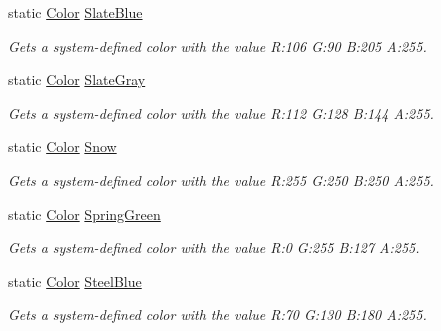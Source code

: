 \begin{DoxyCompactItemize}
static \hyperlink{struct_microsoft_1_1_xna_1_1_framework_1_1_color}{Color} \hyperlink{struct_microsoft_1_1_xna_1_1_framework_1_1_color_aaae7c7f86386d149db4082776120bf44}{Slate\+Blue}
\begin{DoxyCompactList}\small\item\em Gets a system-\/defined color with the value R\+:106 G\+:90 B\+:205 A\+:255.\end{DoxyCompactList}\item 
static \hyperlink{struct_microsoft_1_1_xna_1_1_framework_1_1_color}{Color} \hyperlink{struct_microsoft_1_1_xna_1_1_framework_1_1_color_a8cf2b439c5dec633c21744030a33976c}{Slate\+Gray}
\begin{DoxyCompactList}\small\item\em Gets a system-\/defined color with the value R\+:112 G\+:128 B\+:144 A\+:255.\end{DoxyCompactList}\item 
static \hyperlink{struct_microsoft_1_1_xna_1_1_framework_1_1_color}{Color} \hyperlink{struct_microsoft_1_1_xna_1_1_framework_1_1_color_aa5de5b0cb8d037ade2aea36f9d5a00c7}{Snow}
\begin{DoxyCompactList}\small\item\em Gets a system-\/defined color with the value R\+:255 G\+:250 B\+:250 A\+:255.\end{DoxyCompactList}\item 
static \hyperlink{struct_microsoft_1_1_xna_1_1_framework_1_1_color}{Color} \hyperlink{struct_microsoft_1_1_xna_1_1_framework_1_1_color_a69e6aecab8d5afd80a292db4d9e753c8}{Spring\+Green}
\begin{DoxyCompactList}\small\item\em Gets a system-\/defined color with the value R\+:0 G\+:255 B\+:127 A\+:255.\end{DoxyCompactList}\item 
static \hyperlink{struct_microsoft_1_1_xna_1_1_framework_1_1_color}{Color} \hyperlink{struct_microsoft_1_1_xna_1_1_framework_1_1_color_ab654b2c139b5d974fbd4eb4c0d516c5c}{Steel\+Blue}
\begin{DoxyCompactList}\small\item\em Gets a system-\/defined color with the value R\+:70 G\+:130 B\+:180 A\+:255.\end{DoxyCompactList}\item 

\end{DoxyCompactItemize}
